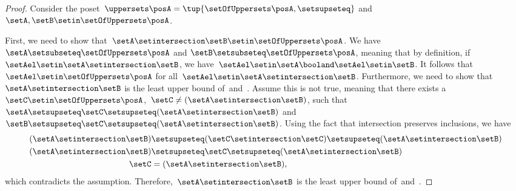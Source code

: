 \begin{proof}
    Consider the poset~$\uppersets \posA=\tup{\setOfUppersets \posA,{{\setsupseteq}}}$ and~$\setA,\setB\setin \setOfUppersets \posA$.

    First, we need to show that~$\setA\setintersection \setB\setin \setOfUppersets \posA$.
    We have~$\setA \setsubseteq \setOfUppersets \posA$ and $\setB\setsubseteq \setOfUppersets \posA$, meaning that by definition, if~$\setAel\setin \setA\setintersection \setB$, we have~$\setAel \setin \setA \booland \setAel \setin \setB$.
    It follows that~$\setAel \setin \setOfUppersets \posA$ for all~$\setAel \setin \setA\setintersection \setB$.
    Furthermore, we need to show that~$\setA\setintersection \setB$ is the least upper bound of~\setA and~\setB.
    Assume this is not true, meaning that there exists a~$\setC\setin \setOfUppersets \posA$,~$\setC\neq (\setA\setintersection \setB)$, such that~$\setA\setsupseteq \setC\setsupseteq (\setA\setintersection \setB)$ and~$\setB\setsupseteq \setC\setsupseteq (\setA\setintersection \setB)$.
    Using the fact that intersection preserves inclusions, we have
    \begin{equation}
        \begin{aligned}
            (\setA\setintersection \setB)
                                          & \setsupseteq (\setC\setintersection \setC) \setsupseteq (\setA\setintersection \setB ) \\
            (\setA\setintersection \setB) & \setsupseteq \setC \setsupseteq (\setA\setintersection \setB ) \\
            \setC                         & = (\setA\setintersection \setB),
        \end{aligned}
    \end{equation}
    which contradicts the assumption.
    Therefore,~$\setA\setintersection \setB$ is the least upper bound of~\setA and~\setB.


\end{proof}

